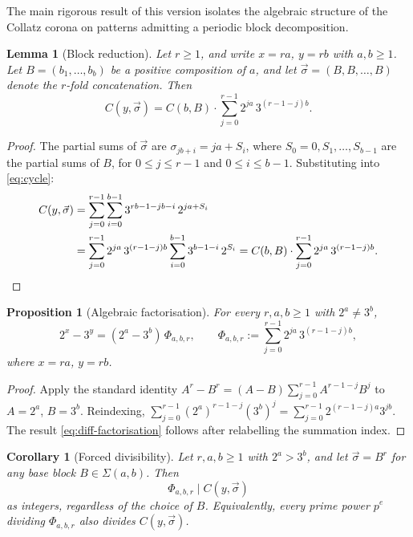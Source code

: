 \documentclass[11pt,a4paper]{article}
\theoremstyle{plain}
\newtheorem{lemma}[theorem]{Lemma}
\newtheorem{corollary}[theorem]{Corollary}
\newtheorem{proposition}[theorem]{Proposition}
\theoremstyle{definition}
\begin{document}
The main rigorous result of this version isolates the algebraic structure of
the Collatz corona on patterns admitting a periodic block decomposition.

\begin{lemma}[Block reduction]\label{lem:block}
Let $r \ge 1$, and write $x = r a$, $y = r b$ with $a, b \ge 1$. Let
$B = (b_1, \ldots, b_b)$ be a positive composition of $a$, and let
$\vec\sigma = (B, B, \ldots, B)$ denote the $r$-fold concatenation. Then
\begin{equation}\label{eq:block-identity}
C(y, \vec\sigma) = C(b, B) \cdot \sum_{j=0}^{r-1} 2^{j a} \, 3^{(r-1-j) b}.
\end{equation}
\end{lemma}

\begin{proof}
The partial sums of $\vec\sigma$ are
$\sigma_{j b + i} = j a + S_i$,
where $S_0 = 0, S_1, \ldots, S_{b-1}$ are the partial sums of $B$, for
$0 \le j \le r - 1$ and $0 \le i \le b - 1$. Substituting into \eqref{eq:cycle}:
\begin{align*}
C(y, \vec\sigma)
&= \sum_{j=0}^{r-1} \sum_{i=0}^{b-1} 3^{r b - 1 - j b - i} \, 2^{j a + S_i} \\
&= \sum_{j=0}^{r-1} 2^{j a} \, 3^{(r - 1 - j) b}
   \sum_{i=0}^{b-1} 3^{b - 1 - i} \, 2^{S_i}
 = C(b, B) \cdot \sum_{j=0}^{r-1} 2^{j a} \, 3^{(r - 1 - j) b}. \qedhere
\end{align*}
\end{proof}

\begin{proposition}[Algebraic factorisation]\label{prop:factorisation}
For every $r, a, b \ge 1$ with $2^a \neq 3^b$,
\begin{equation}\label{eq:diff-factorisation}
2^x - 3^y = (2^a - 3^b) \, \Phi_{a, b, r},
\qquad
\Phi_{a, b, r} := \sum_{j=0}^{r-1} 2^{j a} \, 3^{(r - 1 - j) b},
\end{equation}
where $x = r a$, $y = r b$.
\end{proposition}

\begin{proof}
Apply the standard identity $A^r - B^r = (A - B) \sum_{j=0}^{r-1} A^{r-1-j} B^j$
to $A = 2^a$, $B = 3^b$. Reindexing, $\sum_{j=0}^{r-1} (2^a)^{r-1-j} (3^b)^j
= \sum_{j=0}^{r-1} 2^{(r-1-j) a} 3^{j b}$. The result \eqref{eq:diff-factorisation}
follows after relabelling the summation index.
\end{proof}

\begin{corollary}[Forced divisibility]\label{cor:forced}
Let $r, a, b \ge 1$ with $2^a > 3^b$, and let $\vec\sigma = B^r$ for any
base block $B \in \Sigma(a, b)$. Then
\[
\Phi_{a, b, r} \mid C(y, \vec\sigma)
\]
as integers, regardless of the choice of $B$. Equivalently, every prime
power $p^e$ dividing $\Phi_{a, b, r}$ also divides $C(y, \vec\sigma)$.
\end{corollary}
\end{document}
